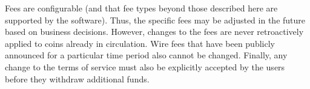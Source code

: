 \documentclass[10pt,a4paper,oneside]{book}
\begin{document}
Fees are configurable (and that fee types beyond those described here are
supported by the software). Thus, the specific fees may be adjusted in the
future based on business decisions.  However, changes to the fees are never
retroactively applied to coins already in circulation.  Wire fees that have
been publicly announced for a particular time period also cannot be changed.
Finally, any change to the terms of service must also be explicitly accepted
by the users before they withdraw additional funds.




%
\end{document}
